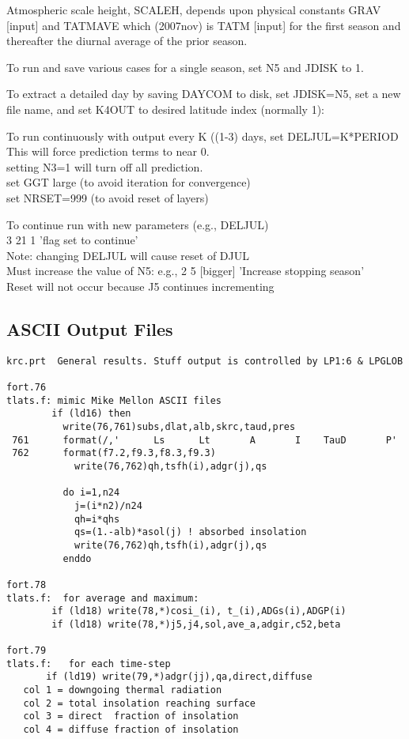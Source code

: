 \documentclass[draft]{article}  %
\newcommand{\qi}{\\ \hspace*{2.em}}      %
\begin{document}
Atmospheric scale height, SCALEH, depends upon physical constants GRAV [input] 
and TATMAVE which (2007nov) is TATM [input] for the first season and 
thereafter the diurnal average of the prior season. 
 
To run and save various cases for a single season, set N5 and JDISK to 1.

To extract a detailed day by saving DAYCOM to disk, set JDISK=N5, set a new
file name, and set K4OUT to desired latitude index (normally 1):

To run continuously with output every K ((1-3) days, set DELJUL=K*PERIOD
This will force prediction terms to near 0.
\qi        setting N3=1 will turn off all prediction.
\qi        set GGT large (to avoid iteration for convergence)
\qi        set NRSET=999 (to avoid reset of layers)

To continue run with new parameters (e.g., DELJUL)
\qi	3 21 1 'flag set to continue' \\
Note: changing DELJUL will cause reset of DJUL \\
Must increase the value of N5: e.g., 2 5 [bigger] 'Increase stopping season' 
\qi Reset will not occur because J5 continues incrementing


\subsection{ASCII Output Files} %
\vspace{-3.mm}
\begin{verbatim}
krc.prt  General results. Stuff output is controlled by LP1:6 & LPGLOB

fort.76
tlats.f: mimic Mike Mellon ASCII files
        if (ld16) then
          write(76,761)subs,dlat,alb,skrc,taud,pres
 761      format(/,'      Ls      Lt       A       I    TauD       P'
 762      format(f7.2,f9.3,f8.3,f9.3)
            write(76,762)qh,tsfh(i),adgr(j),qs

          do i=1,n24
            j=(i*n2)/n24
            qh=i*qhs
            qs=(1.-alb)*asol(j) ! absorbed insolation
            write(76,762)qh,tsfh(i),adgr(j),qs
          enddo

fort.78
tlats.f:  for average and maximum:
        if (ld18) write(78,*)cosi_(i), t_(i),ADGs(i),ADGP(i)
        if (ld18) write(78,*)j5,j4,sol,ave_a,adgir,c52,beta

fort.79
tlats.f:   for each time-step
       if (ld19) write(79,*)adgr(jj),qa,direct,diffuse
   col 1 = downgoing thermal radiation
   col 2 = total insolation reaching surface
   col 3 = direct  fraction of insolation
   col 4 = diffuse fraction of insolation
\end{verbatim}
\end{document}
